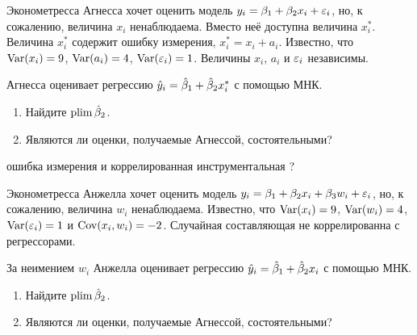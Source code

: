 \begin{problem}
Эконометресса Агнесса хочет оценить модель $y_i=\beta_1+\beta_2 x_i +\varepsilon_i$, но, к сожалению, величина $x_i$ ненаблюдаема. Вместо неё доступна величина  $x_i^*$. Величина $x_i^*$  содержит ошибку измерения, $x_i^*=x_i+a_i$. Известно, что $\operatorname{Var}(x_i)=9$, $\operatorname{Var}(a_i)=4$,   $\operatorname{Var}(\varepsilon_i)=1$. Величины $x_i$, $a_i$ и $\varepsilon_i$ независимы.

Агнесса оценивает регрессию $\hat{y}_i=\hat{\beta}_1+\hat{\beta}_2 x_i^*$ с помощью МНК.
\begin{enumerate}
\item Найдите $\operatorname*{plim} \hat{\beta}_2$.
\item Являются ли оценки, получаемые Агнессой, состоятельными?
\end{enumerate}


\begin{sol}
\end{sol}
\end{problem}



\begin{problem}
ошибка измерения и коррелированная инструментальная ?
\begin{sol}
\end{sol}
\end{problem}



\begin{problem}
Эконометресса Анжелла хочет оценить модель $y_i=\beta_1+\beta_2 x_i +\beta_3 w_i +\varepsilon_i$, но, к сожалению, величина $w_i$ ненаблюдаема. Известно, что $\operatorname{Var}(x_i)=9$, $\operatorname{Var}(w_i)=4$,  $\operatorname{Var}(\varepsilon_i)=1$ и $\operatorname{Cov}(x_i,w_i)=-2$. Случайная составляющая не коррелированна с регрессорами.

За неимением $w_i$ Анжелла оценивает регрессию $\hat{y}_i=\hat{\beta}_1+\hat{\beta}_2 x_i$ с помощью МНК.
\begin{enumerate}
\item Найдите $\operatorname*{plim} \hat{\beta}_2$.
\item Являются ли оценки, получаемые Агнессой, состоятельными?
\end{enumerate}



\begin{sol}
\end{sol}
\end{problem}




